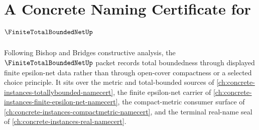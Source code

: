 \chapter{A Concrete Naming Certificate for $\FiniteTotalBoundedNetUp$}
\label{ch:concrete-instances-finite-total-bounded-net-namecert}

Following Bishop and Bridges constructive analysis, the $\FiniteTotalBoundedNetUp$ packet records total boundedness through displayed finite epsilon-net data rather than through open-cover compactness or a selected choice principle. It sits over the metric and total-bounded sources of \autoref{ch:concrete-instances-totallybounded-namecert}, the finite epsilon-net carrier of \autoref{ch:concrete-instances-finite-epsilon-net-namecert}, the compact-metric consumer surface of \autoref{ch:concrete-instances-compactmetric-namecert}, and the terminal real-name seal of \autoref{ch:concrete-instances-real-namecert}.

